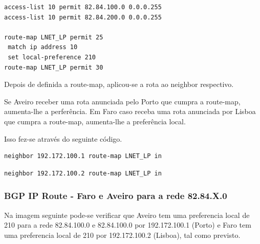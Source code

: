 \documentclass[11pt,a4paper]{report}
\begin{document}
\begin{lstlisting}[caption=Route-map para a netL1 e netL2]
access-list 10 permit 82.84.100.0 0.0.0.255
access-list 10 permit 82.84.200.0 0.0.0.255

route-map LNET_LP permit 25
 match ip address 10
 set local-preference 210
route-map LNET_LP permit 30
\end{lstlisting}

Depois de definida a route-map, aplicou-se a rota ao neighbor respectivo.

Se Aveiro receber uma rota anunciada pelo Porto que cumpra a route-map, aumenta-lhe a perferência. Em Faro caso receba uma rota anunciada por Lisboa que cumpra a route-map, aumenta-lhe a preferência local.

Isso fez-se através do seguinte código.\\
\begin{lstlisting}[caption=Route-map LNET\_LP no Neighbor Porto no Router de Aveiro]
  neighbor 192.172.100.1 route-map LNET_LP in
\end{lstlisting}

\begin{lstlisting}[caption=Route-map LNET\_LP no Neighbor Lisboa no Router de Faro]
  neighbor 192.172.100.2 route-map LNET_LP in
\end{lstlisting}

\subsubsection{BGP IP Route - Faro e Aveiro para a rede 82.84.X.0}

Na imagem seguinte pode-se verificar que Aveiro tem uma preferencia local de 210 para a rede 82.84.100.0 e 82.84.100.0 por 192.172.100.1 (Porto) e Faro tem uma preferencia local de 210 por 192.172.100.2 (Lisboa), tal como previsto.
\end{document}
